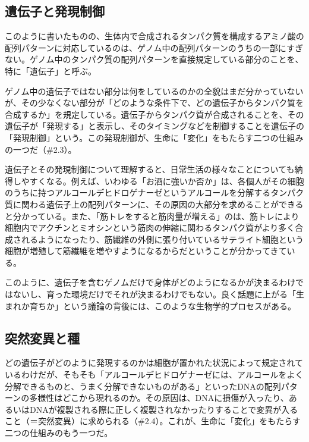 \subsection{遺伝子と発現制御}\label{ux907aux4f1dux5b50ux3068ux767aux73feux5236ux5fa1}

このように書いたものの、生体内で合成されるタンパク質を構成するアミノ酸の配列パターンに対応しているのは、ゲノム中の配列パターンのうちの一部にすぎない。ゲノム中のタンパク質の配列パターンを直接規定している部分のことを、特に「遺伝子」と呼ぶ。

ゲノム中の遺伝子ではない部分は何をしているのかの全貌はまだ分かっていないが、その少なくない部分が「どのような条件下で、どの遺伝子からタンパク質を合成するか」を規定している。遺伝子からタンパク質が合成されることを、その遺伝子が「発現する」と表示し、そのタイミングなどを制御することを遺伝子の「発現制御」という。この発現制御が、生命に「変化」をもたらす二つの仕組みの一つだ（\#2.3）。

遺伝子とその発現制御について理解すると、日常生活の様々なことについても納得しやすくなる。例えば、いわゆる「お酒に強いか否か」は、各個人がその細胞のうちに持つアルコールデヒドロゲナーゼというアルコールを分解するタンパク質に関わる遺伝子上の配列パターンに、その原因の大部分を求めることができると分かっている。また、「筋トレをすると筋肉量が増える」のは、筋トレにより細胞内でアクチンとミオシンという筋肉の伸縮に関わるタンパク質がより多く合成されるようになったり、筋繊維の外側に張り付いているサテライト細胞という細胞が増殖して筋繊維を増やすようになるからだということが分かってきている。

このように、遺伝子を含むゲノムだけで身体がどのようになるかが決まるわけではないし、育った環境だけでそれが決まるわけでもない。良く話題に上がる「生まれか育ちか」という議論の背後には、このような生物学的プロセスがある。

\subsection{突然変異と種}\label{ux7a81ux7136ux5909ux7570ux3068ux7a2e}

どの遺伝子がどのように発現するのかは細胞が置かれた状況によって規定されているわけだが、そもそも「アルコールデヒドロゲナーゼには、アルコールをよく分解できるものと、うまく分解できないものがある」といったDNAの配列パターンの多様性はどこから現れるのか。その原因は、DNAに損傷が入ったり、あるいはDNAが複製される際に正しく複製されなかったりすることで変異が入ること（＝突然変異）に求められる（\#2.4）。これが、生命に「変化」をもたらす二つの仕組みのもう一つだ。

